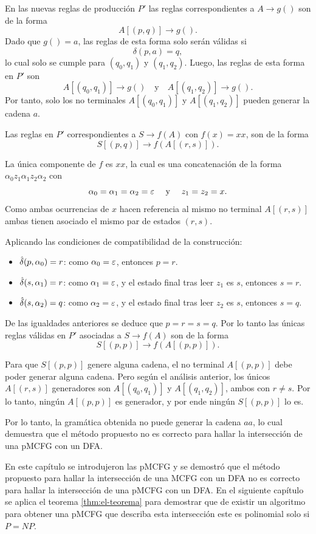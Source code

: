 En las nuevas reglas de producción $P'$ las reglas correspondientes a $A \to g()$ son de la forma
$$
    A[(p, q)] \to g().
$$
Dado que $g() = a$, las reglas de esta forma solo serán válidas si
$$
    \delta(p, a) = q,
$$
lo cual solo se cumple para $(q_0, q_1)$ y $(q_1, q_2)$. Luego, las reglas de esta forma en $P'$ son
$$
    A[(q_0, q_1)] \to g() \quad \text{y} \quad A[(q_1, q_2)] \to g().
$$
Por tanto, solo los no terminales $A[(q_0, q_1)]$ y $A[(q_1, q_2)]$ pueden generar la cadena $a$.

Las reglas en $P'$ correspondientes a $S \to f(A)$ con $f(x) = xx$, son de la forma
$$
    S[(p, q)] \to f(A[(r, s)]).
$$

La única componente de $f$ es $xx$, la cual es una concatenación de la forma
$\alpha_0 z_1 \alpha_1 z_2 \alpha_2$ con
$$
    \alpha_0 = \alpha_1 = \alpha_2 = \varepsilon \quad \text{ y } \quad z_1 = z_2 = x.
$$
Como ambas ocurrencias de $x$ hacen referencia al mismo no terminal $A[(r, s)]$ ambas tienen asociado el mismo par de estados $(r, s)$.

Aplicando las condiciones de compatibilidad de la construcción:
\begin{itemize}
    \item $\hat{\delta}(p, \alpha_0) = r$: como $\alpha_0 = \varepsilon$, entonces $p = r$.
    \item $\hat{\delta}(s, \alpha_1) = r$: como $\alpha_1 = \varepsilon$, y el estado final tras leer $z_1$ es $s$, entonces $s = r$.
    \item $\hat{\delta}(s, \alpha_2) = q$: como $\alpha_2 = \varepsilon$, y el estado final tras leer $z_2$ es $s$, entonces $s = q$.
\end{itemize}

De las igualdades anteriores se deduce que $p = r = s = q$. Por lo tanto las únicas reglas válidas en $P'$ asociadas a $S \to f(A)$ son de la forma
$$
    S[(p, p)] \to f(A[(p, p)]).
$$

Para que $S[(p, p)]$ genere alguna cadena, el no terminal $A[(p, p)]$ debe poder generar alguna cadena. Pero según el análisis anterior, los únicos $A[(r, s)]$ generadores son $A[(q_0, q_1)]$ y $A[(q_1, q_2)]$, ambos con $r \neq s$. Por lo tanto, ningún $A[(p, p)]$ es generador, y por ende ningún $S[(p, p)]$ lo es.

Por lo tanto, la gramática obtenida no puede generar la cadena $aa$, lo cual demuestra que el método propuesto no es correcto para hallar la intersección de una pMCFG con un DFA.

En este capítulo se introdujeron las pMCFG y se demostró que el método propuesto para hallar la intersección de una MCFG con un DFA no es correcto para hallar la intersección de una pMCFG con un DFA. En el siguiente capítulo se aplica el teorema \ref{thm:el-teorema} para demostrar que de existir un algoritmo para obtener una pMCFG que describa esta intersección este es polinomial solo si $P = NP$.
